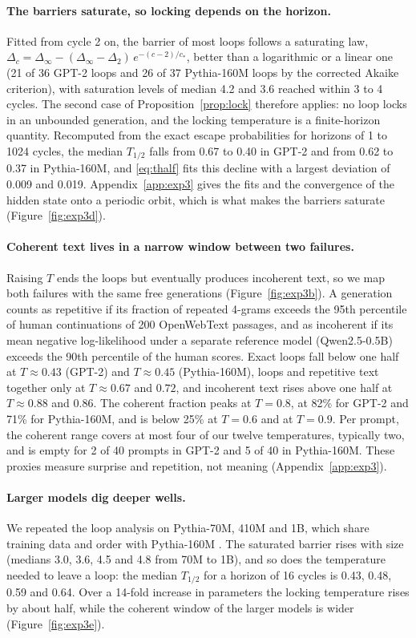 \paragraph{The barriers saturate, so locking depends on the horizon.} Fitted from cycle 2 on, the barrier of most loops follows a saturating law, $\Delta_c=\Delta_\infty-(\Delta_\infty-\Delta_2)\,e^{-(c-2)/c_\ast}$, better than a logarithmic or a linear one (21 of 36 GPT-2 loops and 26 of 37 Pythia-160M loops by the corrected Akaike criterion), with saturation levels of median 4.2 and 3.6 reached within 3 to 4 cycles. The second case of Proposition~\ref{prop:lock} therefore applies: no loop locks in an unbounded generation, and the locking temperature is a finite-horizon quantity. Recomputed from the exact escape probabilities for horizons of 1 to 1024 cycles, the median $T_{1/2}$ falls from 0.67 to 0.40 in GPT-2 and from 0.62 to 0.37 in Pythia-160M, and \eqref{eq:thalf} fits this decline with a largest deviation of 0.009 and 0.019. Appendix~\ref{app:exp3} gives the fits and the convergence of the hidden state onto a periodic orbit, which is what makes the barriers saturate (Figure~\ref{fig:exp3d}).

\paragraph{Coherent text lives in a narrow window between two failures.} Raising $T$ ends the loops but eventually produces incoherent text, so we map both failures with the same free generations (Figure~\ref{fig:exp3b}). A generation counts as repetitive if its fraction of repeated 4-grams exceeds the 95th percentile of human continuations of 200 OpenWebText passages, and as incoherent if its mean negative log-likelihood under a separate reference model (Qwen2.5-0.5B) exceeds the 90th percentile of the human scores. Exact loops fall below one half at $T\approx0.43$ (GPT-2) and $T\approx0.45$ (Pythia-160M), loops and repetitive text together only at $T\approx0.67$ and $0.72$, and incoherent text rises above one half at $T\approx0.88$ and $0.86$. The coherent fraction peaks at $T=0.8$, at 82\% for GPT-2 and 71\% for Pythia-160M, and is below 25\% at $T=0.6$ and at $T=0.9$. Per prompt, the coherent range covers at most four of our twelve temperatures, typically two, and is empty for 2 of 40 prompts in GPT-2 and 5 of 40 in Pythia-160M. These proxies measure surprise and repetition, not meaning (Appendix~\ref{app:exp3}).

\paragraph{Larger models dig deeper wells.} We repeated the loop analysis on Pythia-70M, 410M and 1B, which share training data and order with Pythia-160M \citep{biderman2023pythia}. The saturated barrier rises with size (medians 3.0, 3.6, 4.5 and 4.8 from 70M to 1B), and so does the temperature needed to leave a loop: the median $T_{1/2}$ for a horizon of 16 cycles is 0.43, 0.48, 0.59 and 0.64. Over a 14-fold increase in parameters the locking temperature rises by about half, while the coherent window of the larger models is wider (Figure~\ref{fig:exp3e}).

